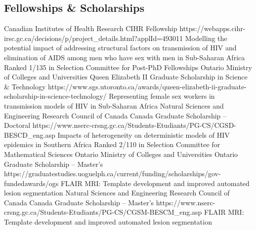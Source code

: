 \subsection{Fellowships \& Scholarships}
  {Canadian Institutes of Health Research}{}
  {CIHR Fellowship}
  {https://webapps.cihr-irsc.gc.ca/decisions/p/project_details.html?applId=493011}
  {Modelling the potential impact of addressing structural factors on transmission of HIV and elimination of AIDS among men who have sex with men in Sub-Saharan Africa}
  {Ranked 1/135 in Selection Committee for Post-PhD Fellowships}
  {Ontario Ministry of Colleges and Universities}{}
  {Queen Elizabeth II Graduate Scholarship in Science \& Technology}
  {https://www.sgs.utoronto.ca/awards/queen-elizabeth-ii-graduate-scholarship-in-science-technology/}
  {Representing female sex workers in transmission models of HIV in Sub-Saharan Africa}
  {}
  {Natural Sciences and Engineering Research Council of Canada}{}
  {Canada Graduate Scholarship -- Doctoral}
  {https://www.nserc-crsng.gc.ca/Students-Etudiants/PG-CS/CGSD-BESCD_eng.asp}
  {Impacts of heterogeneity on deterministic models of HIV epidemics in Southern Africa}
  {Ranked 2/110 in Selection Committee for Mathematical Sciences}
  {Ontario Ministry of Colleges and Universities}{}
  {Ontario Graduate Scholarship -- Master's}
  {https://graduatestudies.uoguelph.ca/current/funding/scholarships/gov-fundedawards/ogs}
  {FLAIR MRI: Template development and improved automated lesion segmentation}
  {}
  {Natural Sciences and Engineering Research Council of Canada}{}
  {Canada Graduate Scholarship -- Master's}
  {https://www.nserc-crsng.gc.ca/Students-Etudiants/PG-CS/CGSM-BESCM_eng.asp}
  {FLAIR MRI: Template development and improved automated lesion segmentation}
  {}


